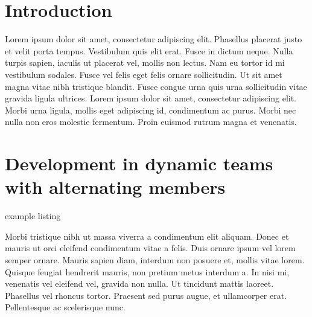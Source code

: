 


\section{Introduction}

Lorem ipsum dolor sit amet, consectetur adipiscing elit. Phasellus placerat
justo et velit porta tempus. Vestibulum quis elit erat. Fusce in dictum neque.
Nulla turpis sapien, iaculis ut placerat vel, mollis non lectus. Nam eu tortor
id mi vestibulum sodales. Fusce vel felis eget felis ornare sollicitudin. Ut
sit amet magna vitae nibh tristique blandit. Fusce congue urna quis urna
sollicitudin vitae gravida ligula ultrices. Lorem ipsum dolor sit amet,
consectetur adipiscing elit. Morbi urna ligula, mollis eget adipiscing id,
condimentum ac purus. Morbi nec nulla non eros molestie fermentum. Proin
euismod rutrum magna et venenatis. 


\newpage
\section{Development in dynamic teams with alternating members}

example listing


Morbi tristique nibh ut massa viverra a condimentum elit aliquam. Donec et
mauris ut orci eleifend condimentum vitae a felis. Duis ornare ipsum vel lorem
semper ornare. Mauris sapien diam, interdum non posuere et, mollis vitae
lorem. Quisque feugiat hendrerit mauris, non pretium metus interdum a. In nisi
mi, venenatis vel eleifend vel, gravida non nulla. Ut tincidunt mattis
laoreet. Phasellus vel rhoncus tortor. Praesent sed purus augue, et
ullamcorper erat. Pellentesque ac scelerisque nunc. 
 
